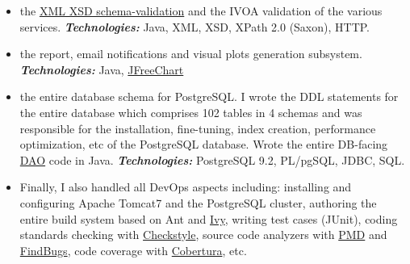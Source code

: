 \documentclass[helvetica,english,logo,notitle,totpages,utf8]{europecv2013}
\newcommand{\technologies}[0]{\textbf{\textit{Technologies:}}}
\begin{document}
\begin{europecv}
{\begin{itemize}
    my own \href{https://docs.oracle.com/javase/6/docs/technotes/tools/share/wsimport.html}{wsimport}-like tool that reads WSDL and generates Java code (stubs and skeletons) to perform SOAP calls.
    \technologies{} Java, SOAP (Jersey), XSD, template-based code generation with \href{http://www.stringtemplate.org/.}{String Template}
  \item the \href{https://en.wikipedia.org/wiki/XML_Schema_(W3C)}{XML XSD schema-validation}
    and the IVOA validation of the various services.
    \technologies{} Java, XML, XSD, XPath 2.0 (Saxon), HTTP.
  \item the report, email notifications and visual plots generation subsystem.
    \technologies{} Java, \href{http://www.jfree.org/jfreechart/}{JFreeChart}
    \item the entire database schema for PostgreSQL. I wrote the DDL statements for the entire database which comprises 102 tables in 4 schemas and was responsible for the installation, fine-tuning, index creation, performance optimization, etc of the PostgreSQL database. Wrote the entire DB-facing \href{https://en.wikipedia.org/wiki/Database_abstraction_layer}{DAO} code in Java.
      \technologies{} PostgreSQL 9.2, PL/pgSQL, JDBC, SQL.
    \item Finally, I also handled all DevOps aspects including: installing and configuring Apache Tomcat7 and the PostgreSQL cluster, authoring the entire build system based on
      Ant and \href{http://ant.apache.org/ivy/}{Ivy}, writing test cases (JUnit), coding standards checking with \href{http://checkstyle.sourceforge.net/}{Checkstyle}, source code analyzers with
      \href{https://pmd.github.io/}{PMD} and \href{http://findbugs.sourceforge.net/}{FindBugs},
      code coverage with \href{http://cobertura.github.io/cobertura/}{Cobertura}, etc.
      \end{itemize}
                                     }




\end{europecv}
\end{document}
